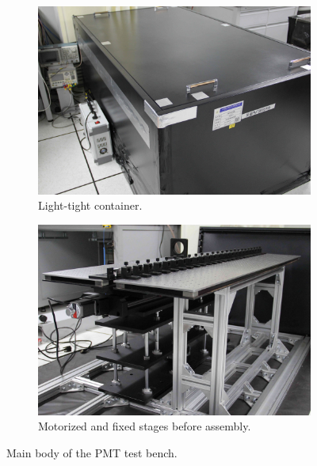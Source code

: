 \documentclass{JINST}
\begin{document}
\begin{figure}[tbp]
	
	\begin{subfigure}[t]{0.5\textwidth}
		\includegraphics[width=0.98\linewidth]{FIG2_a}
		\caption{Light-tight container.}
		\label{fig:FIG2_a}
	\end{subfigure}
	\begin{subfigure}[t]{0.5\textwidth}
		\includegraphics[width=0.98\linewidth]{FIG2_b}
		\caption{Motorized and fixed stages before assembly.}
		\label{fig:FIG2_b}
	\end{subfigure}
	
	\caption{Main body of the PMT test bench.}
	\label{fig:FIG2}
\end{figure}
\end{document}
